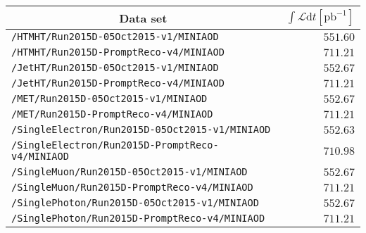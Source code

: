 \begin{center}
\begin{tabular}{lr}
\hline\hline
\multicolumn{1}{c}{Data set}&\multicolumn{1}{c}{$\int\mathcal{L}\textrm{d}t [\textrm{pb}^{-1}]$}\tabularnewline
\hline
\verb!/HTMHT/Run2015D-05Oct2015-v1/MINIAOD! &$551.60$\tabularnewline
\verb!/HTMHT/Run2015D-PromptReco-v4/MINIAOD! &$711.21$\tabularnewline
\verb!/JetHT/Run2015D-05Oct2015-v1/MINIAOD! &$552.67$\tabularnewline
\verb!/JetHT/Run2015D-PromptReco-v4/MINIAOD! &$711.21$\tabularnewline
\verb!/MET/Run2015D-05Oct2015-v1/MINIAOD! &$552.67$\tabularnewline
\verb!/MET/Run2015D-PromptReco-v4/MINIAOD! &$711.21$\tabularnewline
\verb!/SingleElectron/Run2015D-05Oct2015-v1/MINIAOD! &$552.63$\tabularnewline
\verb!/SingleElectron/Run2015D-PromptReco-v4/MINIAOD! &$710.98$\tabularnewline
\verb!/SingleMuon/Run2015D-05Oct2015-v1/MINIAOD! &$552.67$\tabularnewline
\verb!/SingleMuon/Run2015D-PromptReco-v4/MINIAOD! &$711.21$\tabularnewline
\verb!/SinglePhoton/Run2015D-05Oct2015-v1/MINIAOD! &$552.67$\tabularnewline
\verb!/SinglePhoton/Run2015D-PromptReco-v4/MINIAOD! &$711.21$\tabularnewline
 \hline
\end{tabular}\end{center}
